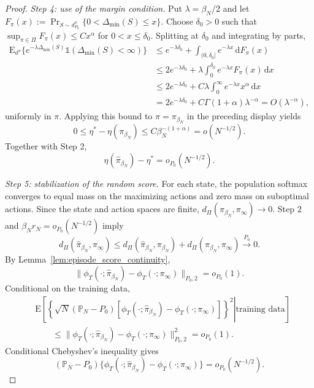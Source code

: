 \documentclass[12pt]{article}
\theoremstyle{remark}\newtheorem{remark}[theorem]{Remark}\theoremstyle{plain}
\newcommand{\E}{\mathrm{E}}
\begin{document}
\begin{proof}
    \emph{Step 4: use of the margin condition.}
    Put $\lambda=\beta_N/2$ and let
    $F_\pi(x):=
      \Pr_{S\sim d_{P_0}^\pi}\{0<\Delta_{\min}(S)\leq x\}$.
    Choose $\delta_0>0$ such that
    $\sup_{\pi\in\Pi}F_\pi(x)\leq Cx^\alpha$ for
    $0<x\leq\delta_0$.  Splitting at $\delta_0$ and integrating by
    parts,
    \[
        \begin{aligned}
        \E_{d^\pi}
        \{e^{-\lambda\Delta_{\min}(S)}
        \mathds{1}(\Delta_{\min}(S)<\infty)\}
        &\leq e^{-\lambda\delta_0}
        +\int_{(0,\delta_0]}e^{-\lambda x}\,\mathrm dF_\pi(x)\\
        &\leq
        2e^{-\lambda\delta_0}
        +\lambda\int_0^{\delta_0}e^{-\lambda x}F_\pi(x)\,\mathrm dx\\
        &\leq
        2e^{-\lambda\delta_0}
        +C\lambda\int_0^\infty e^{-\lambda x}x^\alpha\,\mathrm dx\\
        &=
        2e^{-\lambda\delta_0}
        +C\Gamma(1+\alpha)\lambda^{-\alpha}
        =O(\lambda^{-\alpha}),
        \end{aligned}
    \]
    uniformly in $\pi$.  Applying this bound to
    $\pi=\pi_{\beta_N}$ in the preceding display yields
    \[
        0\leq\eta^*-\eta(\pi_{\beta_N})
        \leq C\beta_N^{-(1+\alpha)}
        =o(N^{-1/2}).
    \]
    Together with Step 2,
    \[
        \eta(\widehat\pi_{\beta_N})-\eta^*
        =o_{P_0}(N^{-1/2}).
    \]

    \emph{Step 5: stabilization of the random score.}
    For each state, the population softmax converges to equal mass on
    the maximizing actions and zero mass on suboptimal actions.
    Since the state and action spaces are finite,
    $d_\Pi(\pi_{\beta_N},\pi_\infty)\to0$.  Step 2 and
    $\beta_Nr_N=o_{P_0}(N^{-1/2})$ imply
    \[
        d_\Pi(\widehat\pi_{\beta_N},\pi_\infty)
        \leq
        d_\Pi(\widehat\pi_{\beta_N},\pi_{\beta_N})
        +d_\Pi(\pi_{\beta_N},\pi_\infty)
        \overset{P_0}{\to}0.
    \]
    By Lemma~\ref{lem:episode_score_continuity},
    \[
        \|\phi_T(\cdot;\widehat\pi_{\beta_N})
          -\phi_T(\cdot;\pi_\infty)\|_{P_0,2}
        =o_{P_0}(1).
    \]
    Conditional on the training data,
    \[
        \begin{aligned}
        &\E\!\left[
        \left.
        \left\{\sqrt N(\mathbb P_N-P_0)
        [\phi_T(\cdot;\widehat\pi_{\beta_N})
        -\phi_T(\cdot;\pi_\infty)]\right\}^2
        \right|\text{training data}\right]\\
        &\qquad\leq
        \|\phi_T(\cdot;\widehat\pi_{\beta_N})
          -\phi_T(\cdot;\pi_\infty)\|_{P_0,2}^2
        =o_{P_0}(1).
        \end{aligned}
    \]
    Conditional Chebyshev's inequality gives
    \[
        (\mathbb P_N-P_0)
        \{\phi_T(\cdot;\widehat\pi_{\beta_N})
        -\phi_T(\cdot;\pi_\infty)\}
        =o_{P_0}(N^{-1/2}).
    \]


\end{proof}
\end{document}
